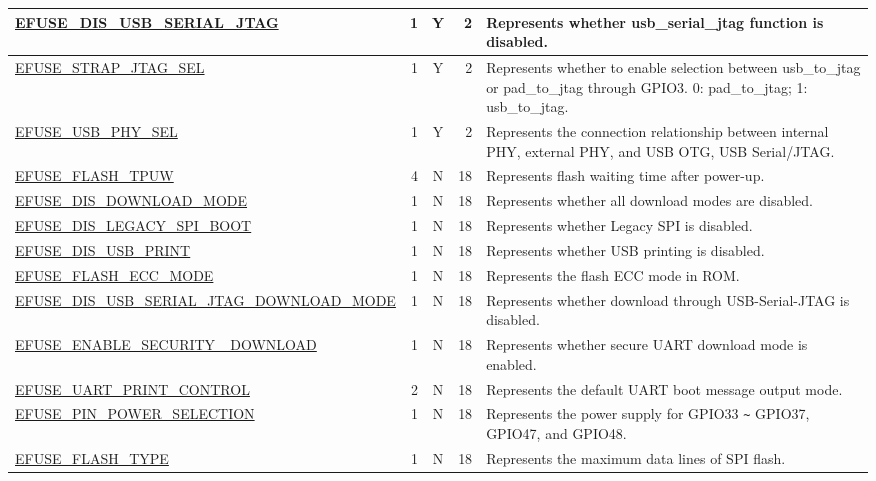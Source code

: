 \begin{longtable}[l]{ |m{8.2cm}|r|c|r|m{9cm}| }
    \hline
    \hyperref[fielddesc:EFUSEDISUSBSERIALJTAG]{EFUSE\_DIS\_USB\_SERIAL\_JTAG} & 1 & Y & 2 & Represents whether usb\_serial\_jtag function is disabled. \\
    \hline
    \hyperref[fielddesc:EFUSESTRAPJTAGSEL]{EFUSE\_STRAP\_JTAG\_SEL} & 1 & Y & 2 & Represents whether to enable selection between usb\_to\_jtag or pad\_to\_jtag through GPIO3. 0: pad\_to\_jtag; 1: usb\_to\_jtag. \\
    \hline
    \hyperref[fielddesc:EFUSEUSBPHYSEL]{EFUSE\_USB\_PHY\_SEL} & 1 & Y & 2 & Represents the connection relationship between internal PHY, external PHY, and USB OTG, USB Serial/JTAG. \\
    \hline
    \hyperref[fielddesc:EFUSEFLASHTPUW]{EFUSE\_FLASH\_TPUW} & 4 & N & 18 & Represents flash waiting time after power-up. \\    
    \hline    
    \hyperref[fielddesc:EFUSEDISDOWNLOADMODE]{EFUSE\_DIS\_DOWNLOAD\_MODE} & 1 & N & 18 & Represents whether all download modes are disabled.\\       
    \hline
    \hyperref[fielddesc:EFUSEDISLEGACYSPIBOOT]{EFUSE\_DIS\_LEGACY\_SPI\_BOOT} & 1 & N & 18 & Represents whether Legacy SPI is disabled. \\
    \hline
    \hyperref[fielddesc:EFUSEDISUSBPRINT]{EFUSE\_DIS\_USB\_PRINT} & 1 & N & 18 & Represents whether USB printing is disabled. \\
    \hline  
    \hyperref[fielddesc:EFUSEFLASHECCMODE]{EFUSE\_FLASH\_ECC\_MODE} & 1 & N & 18 & Represents the flash ECC mode in ROM. \\
    \hline
    \hyperref[fielddesc:EFUSEDISUSBSERIALJTAGDOWNLOADMODE]{EFUSE\_DIS\_USB\_SERIAL\_JTAG\_DOWNLOAD\_MODE} & 1 & N & 18 & Represents whether download through USB-Serial-JTAG is disabled. \\
    \hline 
    \hyperref[fielddesc:EFUSEENABLESECURITYDOWNLOAD]{EFUSE\_ENABLE\_SECURITY\_
    DOWNLOAD} & 1 & N & 18 & Represents whether secure UART download mode is enabled. \\
    \hline
    \hyperref[fielddesc:EFUSEUARTPRINTCONTROL]{EFUSE\_UART\_PRINT\_CONTROL} & 2 & N & 18 & Represents the default UART boot message output mode. \\
    \hline
    \hyperref[fielddesc:EFUSEPINPOWERSELECTION]{EFUSE\_PIN\_POWER\_SELECTION} & 1 & N & 18 & Represents the power supply for GPIO33 \verb+~+ GPIO37, GPIO47, and GPIO48. \\
    \hline
    \hyperref[fielddesc:EFUSEFLASHTYPE]{EFUSE\_FLASH\_TYPE} & 1 & N & 18 & Represents the maximum data lines of SPI flash. \\

\end{longtable}
